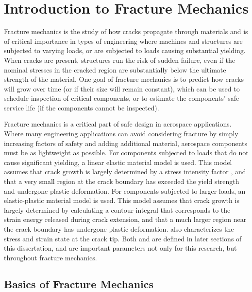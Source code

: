 \chapter{Introduction to Fracture Mechanics} \label{chap:app-intro-fracture}

Fracture mechanics is the study of how cracks propagate through materials and is of critical importance in types of engineering where machines and structures are subjected to varying loads, or are subjected to loads causing substantial yielding.
When cracks are present, structures run the risk of sudden failure, even if the nominal stresses in the cracked region are substantially below the ultimate strength of the material.
One goal of fracture mechanics is to predict how cracks will grow over time (or if their size will remain constant), which can be used to schedule inspection of critical components, or to estimate the components' safe service life (if the components cannot be inspected).

Fracture mechanics is a critical part of safe design in aerospace applications.
Where many engineering applications can avoid considering fracture by simply increasing factors of safety and adding additional material, aerospace components must be as lightweight as possible.
For components subjected to loads that do not cause significant yielding, a linear elastic material model is used.
This model assumes that crack growth is largely determined by a stress intensity factor \K, and that a very small region at the crack boundary has exceeded the yield strength and undergone plastic deformation.
For components subjected to larger loads, an elastic-plastic material model is used.
This model assumes that crack growth is largely determined by calculating a contour integral \J that corresponds to the strain energy released during crack extension, and that a much larger region near the crack boundary has undergone plastic deformation.
\J also characterizes the stress and strain state at the crack tip.
Both \K and \J are defined in later sections of this dissertation, and are important parameters not only for this research, but throughout fracture mechanics.

\section{Basics of Fracture Mechanics}

